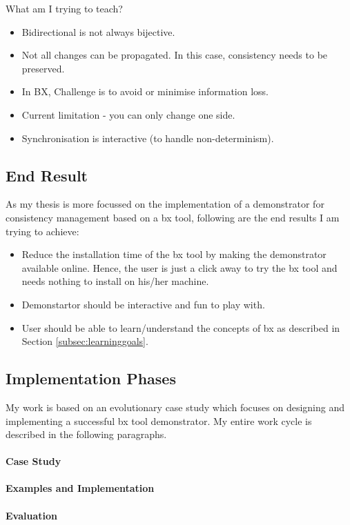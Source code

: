 What am I trying to teach?
\begin{itemize} 
	\item {Bidirectional is not always bijective.} 
	\item {Not all changes can be propagated. In this case, consistency needs to be preserved.}
	\item {In BX, Challenge is to avoid or minimise information loss.}
	\item {Current limitation - you can only change one side.}
	\item {Synchronisation is interactive (to handle non-determinism).}	
\end{itemize}

\subsection{End Result}\label{subsec:endresult}
As my thesis is more focussed on the implementation of a demonstrator for consistency management based on a bx tool, following are the end results I am trying to achieve:
\begin{itemize} 
	\item {Reduce the installation time of the bx tool by making the demonstrator available online. Hence, the user is just a click away to try the bx tool and needs nothing to install on his/her machine.} 
	\item {Demonstartor should be interactive and fun to play with.}
	\item {User should be able to learn/understand the concepts of bx as described in Section \ref{subsec:learninggoals}.}
\end{itemize}

\subsection{Implementation Phases}\label{subsec:implementationphases}
My work is based on an \ac{evolutionary case study} which focuses on designing and implementing a successful bx tool demonstrator. My entire work cycle is described in the following paragraphs.
\paragraph{Case Study}

\paragraph{Examples and Implementation}

\paragraph{Evaluation}








